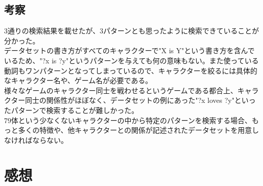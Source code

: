 \documentclass[a4j]{jarticle}
\begin{document}
\subsection{考察}
3通りの検索結果を載せたが、3パターンとも思ったように検索できていることが分かった。\\
データセットの書き方がすべてのキャラクターで"X is Y"という書き方を含んでいるため、"?x is ?y"というパターンを与えても何の意味もない。また使っている動詞もワンパターンとなってしまっているので、キャラクターを絞るには具体的なキャラクター名や、ゲーム名が必要である。\\
様々なゲームのキャラクター同士を戦わせるというゲームである都合上、キャラクター同士の関係性がほぼなく、データセットの例にあった"?x loves ?y"といったパターンで検索することが難しかった。\\
79体という少なくないキャラクターの中から特定のパターンを検索する場合、もっと多くの特徴や、他キャラクターとの関係が記述されたデータセットを用意しなければならない。

\section{感想}



\end{document}
